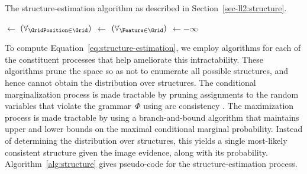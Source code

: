 \begin{algorithm}[t]
  \caption{The structure-estimation algorithm as described in
    Section~\ref{sec-ll2:structure}.}
  \GridPositions$\leftarrow$ $(\forall_{\GridPosition\in\Grid})$
  \;
  \Features$\leftarrow$ $(\forall_{\Feature\in\Grid})$
  \Detector{\Feature,\Image}\;
  \BestP$\leftarrow-\infty$\;
  \While{\CSPSolutionsExist{}}{
    \Pro$\leftarrow$\hspace{-5ex}$\displaystyle \prod_{\Bound{\Features}}$\hspace{-5ex}
    \Probability{\Feature}\hspace{-5ex}$\displaystyle
    \prod_{\Bound{\GridPositions}}$ \hspace{-5ex}\Probability{\GridPosition}\;
    \If{$(\forall_{\Features})$\Bound{\Feature}$\wedge$
      $(\forall_{\GridPositions})$\Bound{\GridPosition}}{
      \If{\Pro$>$ \BestP}{\BestP$\leftarrow$ \Pro\;
        \BestS$\leftarrow$ \GridPositions\;
      }
      \Backtrack{}\;
    }
    \lIf{\Pro$<$ \BestP}{\Backtrack{}}\;
    \Bind{\Select{\Unbound{\GridPosition$\cup$ \Feature}}}\;
    \AC{\Constraints}\;
    \lIf{\Inconsistent{}}{\Backtrack{}}
  }
  \label{alg:structure}
\end{algorithm}

To compute Equation~\ref{eq:structure-estimation}, we employ algorithms
for each of the constituent processes that help ameliorate this intractability.
%
These algorithms prune the space so as not to enumerate all possible
structures, and hence cannot obtain the distribution over structures.
%
The conditional marginalization process is made tractable by pruning
assignments to the random variables that violate the grammar~$\Phi$ using arc
consistency \cite{Mackworth1977}.
%
The maximization process is made tractable by using a branch-and-bound
algorithm \cite{Land1960} that maintains upper and lower bounds on the maximal
conditional marginal probability.
%
Instead of determining the distribution over structures, this yields a single
most-likely consistent structure given the image evidence, along with its
probability.
%
Algorithm~\ref{alg:structure} gives pseudo-code for the structure-estimation
process.

